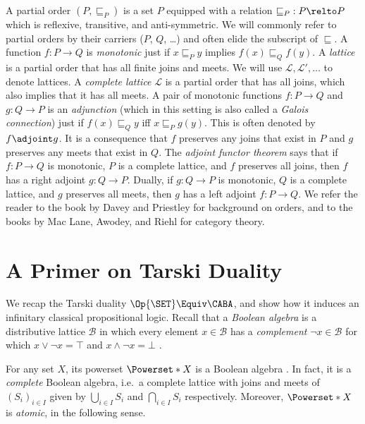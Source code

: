 \documentclass[10pt,a4paper]{article}
\begin{document}
A partial order $(P, \sqsubseteq_P)$ is a set $P$ equipped with a relation
$\mathord{\sqsubseteq_P} : P \relto P$ which is reflexive, transitive, and
anti-symmetric. We will commonly refer to partial orders by their carriers ($P$,
$Q$, \ldots) and often elide the subscript of $\sqsubseteq$. A function $f : P
\to Q$ is \emph{monotonic} just if $x \sqsubseteq_P y$ implies $f(x)
\sqsubseteq_Q f(y)$. A \emph{lattice} is a partial order that has all finite
joins and meets. We will use $\mathcal{L}, \mathcal{L}', \ldots$ to denote
lattices. A \emph{complete lattice} $\mathcal{L}$ is a partial order that has
all joins, which also implies that it has all meets. A pair of monotonic
functions $f : P \to Q$ and $g : Q \to P$ is an \emph{adjunction} (which in this
setting is also called a \emph{Galois connection}) just if $f(x) \sqsubseteq_Q
y$ iff $x \sqsubseteq_P g(y)$. This is often denoted by $f \adjoint g$. It is a
consequence that $f$ preserves any joins that exist in $P$ and $g$ preserves any
meets that exist in $Q$. The \emph{adjoint functor theorem} \cite[\S
7.34]{davey_2002} \cite[\S I.4.2]{johnstone_1982} says that if $f : P \to Q$ is
monotonic, $P$ is a complete lattice, and $f$ preserves all joins, then $f$ has
a right adjoint $g : Q \to P$. Dually, if \(g : Q \to P\) is monotonic, \(Q\) is
a complete lattice, and \(g\) preserves all meets, then \(g\) has a left adjoint
\(f : P \to Q\). We refer the reader to the book by Davey and Priestley
\cite{davey_2002} for background on orders, and to the books by Mac Lane,
Awodey, and Riehl \cite{mac_lane_1978,awodey_2010,riehl_2016} for category
theory.


\section{A Primer on Tarski Duality}\label{section:tarski}

We recap the Tarski duality $\Op{\SET} \Equiv \CABA$, and show how it induces an
infinitary classical propositional logic. Recall that a \emph{Boolean algebra}
is a distributive lattice $\mathcal{B}$ in which every element $x \in
\mathcal{B}$ has a \emph{complement} $\lnot x \in \mathcal{B}$ for which $x \lor
\lnot x = \top$ and $x \land \lnot x = \bot$ \cite{johnstone_1982}.

For any set $X$, its powerset $\Powerset*{X}$ is a Boolean algebra \cite[\S
5.2]{davey_2002}. In fact, it is a \emph{complete} Boolean algebra, i.e.\ a complete
lattice with joins and meets of $(S_i)_{i \in I}$ given by $\bigcup_{i \in I} S_i$ and
$\bigcap_{i \in I} S_i$ respectively. Moreover, $\Powerset*{X}$ is \emph{atomic}, in the
following sense.
\end{document}
